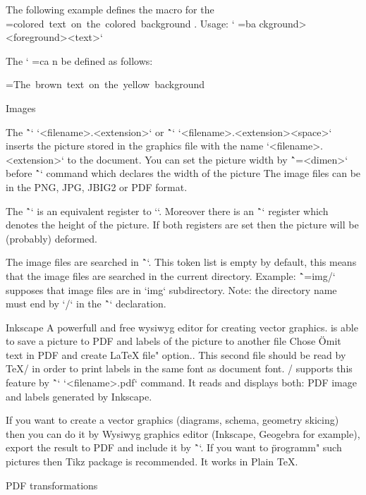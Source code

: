 {\def\coloron#1#2#3{%
   \setbox0=\hbox{{#2#3}}\leavevmode
   \localcolor \rlap{#1\strut \vrule width\wd0}
}
The following example defines the macro for the
\coloron\Yellow\Brown{colored text on the colored background}. Usage:
`\coloron<background><foreground>{<text>}`

The `\coloron` can be defined as follows:

\begtt
\def\coloron#1#2#3{%
   \setbox0=\hbox{{#2#3}}%
   \leavevmode \rlap{#1\strut \vrule width\wd0}
}
\coloron\Yellow\Brown{The brown text on the yellow background}
\endtt

\secc Images

The \^`\inspic` `{<filename>.<extension>}` or
\^`\inspic` `<filename>.<extension><space>`
inserts the picture stored in
the graphics file with the name `<filename>.<extension>` to the document. 
You can set the picture width by \^`\picw=<dimen>`
before \^`\inspic` command which declares the width of the picture 
The image files can be in the PNG, JPG, JBIG2 or PDF format. 

The \^`\picwidth` is an equivalent register to `\picw`. Moreover there is an
\^`\picheight` register which denotes the height of the picture. If both
registers are set then the picture will be (probably) deformed. 

The image files are searched in \^`\picdir`. This token list is empty 
by default, this means that the image files are searched in the 
current directory. Example: \^`\picdir={img/}` supposes that image files are
in `img` subdirectory. Note: the directory name must end by `/` in 
the \^`\picdir` declaration.

Inkscape\fnote
{A powerfull and free wysiwyg editor for creating vector graphics.} 
is able to save a picture to PDF and labels of the picture to another
file\fnote
{Chose \"Omit text in PDF and create LaTeX file" option.}. 
This second file should be read by \TeX/ in order to print labels
in the same font as document font. \OpTeX/ supports this feature by
\^`\inkinspic` `{<filename>.pdf}` command. It reads and displays 
both: PDF image and labels generated by Inkscape.

If you want to create a vector graphics (diagrams, schema, geometry
skicing) then you can do it by Wysiwyg graphics editor (Inkscape, Geogebra for
example), export the result to PDF and include it by \^`\inspic`.
If you want to \"programm" such pictures then Tikz package is recommended.
It works in Plain \TeX. 

\secc PDF transformations

}
